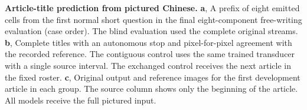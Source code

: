 \textbf{Article-title prediction from pictured Chinese.}
\textbf{a}, A prefix of eight emitted cells from the first normal short
question in the final eight-component free-writing evaluation (case order).
The blind evaluation used the complete original streams.
\textbf{b}, Complete titles with an autonomous stop and pixel-for-pixel
agreement with the recorded reference. The contiguous control uses the same
trained transducer with a single source interval. The exchanged control
receives the next article in the fixed roster.
\textbf{c}, Original output and reference images for the first development
article in each group. The source column shows only the beginning of the
article. All models receive the full pictured input.
